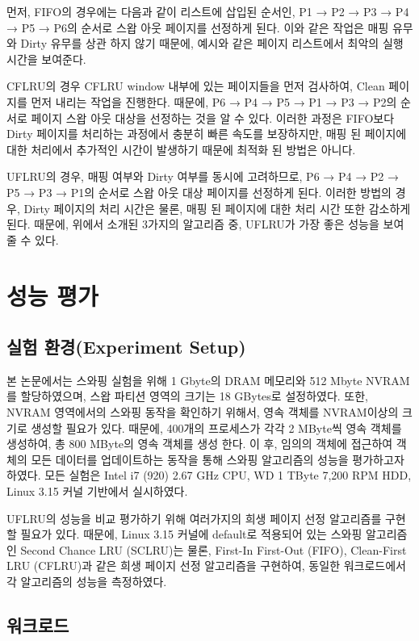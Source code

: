 \documentclass[letterpaper,twocolumn,10pt]{article}
\begin{document}
먼저, FIFO의 경우에는 다음과 같이 리스트에 삽입된 순서인, P1 → P2 → P3 → P4 → P5 → P6의 순서로 스왑 아웃 페이지를 선정하게 된다. 이와 같은 작업은 매핑 유무와 Dirty 유무를 상관 하지 않기 때문에, 예시와 같은 페이지 리스트에서 최악의 실행 시간을 보여준다. 

CFLRU의 경우 CFLRU window 내부에 있는 페이지들을 먼저 검사하여, Clean 페이지를 먼저 내리는 작업을 진행한다. 때문에, P6 → P4 → P5 → P1 → P3 → P2의 순서로 페이지 스왑 아웃 대상을 선정하는 것을 알 수 있다. 이러한 과정은 FIFO보다 Dirty 페이지를 처리하는 과정에서 충분히 빠른 속도를 보장하지만, 매핑 된 페이지에 대한 처리에서 추가적인 시간이 발생하기 때문에 최적화 된 방법은 아니다. 

UFLRU의 경우, 매핑 여부와 Dirty 여부를 동시에 고려하므로, P6 → P4 → P2 → P5 → P3 → P1의 순서로 스왑 아웃 대상 페이지를 선정하게 된다. 이러한 방법의 경우, Dirty 페이지의 처리 시간은 물론, 매핑 된 페이지에 대한 처리 시간 또한 감소하게 된다. 때문에,  위에서 소개된 3가지의 알고리즘 중, UFLRU가 가장 좋은 성능을 보여줄 수 있다.

\section{성능 평가}
\subsection{실험 환경(Experiment Setup)}
본 논문에서는 스와핑 실험을 위해 1 Gbyte의 DRAM 메모리와 512 Mbyte NVRAM를 할당하였으며, 스왑 파티션 영역의 크기는 18 GBytes로 설정하였다. 또한, NVRAM 영역에서의 스와핑 동작을 확인하기 위해서, 영속 객체를 NVRAM이상의 크기로 생성할 필요가 있다. 때문에, 400개의 프로세스가 각각 2 MByte씩 영속 객체를 생성하여, 총 800 MByte의 영속 객체를 생성 한다. 이 후, 임의의 객체에 접근하여 객체의 모든 데이터를 업데이트하는 동작을 통해 스와핑 알고리즘의 성능을 평가하고자 하였다. 모든 실험은 Intel i7 (920) 2.67 GHz CPU, WD 1 TByte 7,200 RPM HDD, Linux 3.15 커널 기반에서 실시하였다.

UFLRU의 성능을 비교 평가하기 위해 여러가지의 희생 페이지 선정 알고리즘를 구현할 필요가 있다. 때문에, Linux 3.15 커널에 default로 적용되어 있는 스와핑 알고리즘인 Second Chance LRU (SCLRU)는 물론, First-In First-Out (FIFO), Clean-First LRU (CFLRU)과 같은 희생 페이지 선정 알고리즘을 구현하여, 동일한 워크로드에서 각 알고리즘의 성능을 측정하였다.

\subsection{워크로드}
\end{document}
